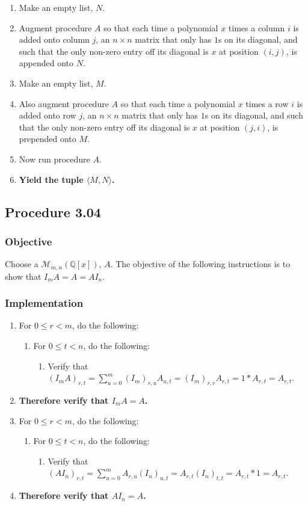 \documentclass[twocolumn]{article}
\newcommand{\procedure}[2][]{\subsection*{Procedure #2 \ifthenelse{\equal{#1}{}}{}{(#1)}}\label{sec:procedure #2}}
\newcommand{\objective}{\subsubsection*{Objective}}
\newcommand{\implementation}{\subsubsection*{Implementation}}
\begin{document}
				\begin{enumerate}
					\item Make an empty list, $N$.
					\item Augment procedure $A$ so that each time a polynomial $x$ times a column $i$ is added onto column $j$, an $n\times n$ matrix that only has $1$s on its diagonal, and such that the only non-zero entry off its diagonal is $x$ at position $(i,j)$, is appended onto $N$.
					\item Make an empty list, $M$.
					\item Also augment procedure $A$ so that each time a polynomial $x$ times a row $i$ is added onto row $j$, an $n\times n$ matrix that only has $1$s on its diagonal, and such that the only non-zero entry off its diagonal is $x$ at position $(j,i)$, is prepended onto $M$.
					\item Now run procedure $A$.
					\item \textbf{Yield the tuple $\langle M,N\rangle$.}
				\end{enumerate}
		\procedure{3.04}
			\objective
				Choose a $\mathcal{M}_{m,n}(\mathbb{Q}[x])$, $A$. The objective of the following instructions is to show that $I_mA=A=AI_n$.
			\implementation
				\begin{enumerate}
					\item For $0\le r<m$, do the following:
					\begin{enumerate}
						\item For $0\le t<n$, do the following:
						\begin{enumerate}
							\item Verify that $(I_mA)_{r,t}=\sum_{u=0}^m (I_m)_{r,u}A_{u,t}=(I_m)_{r,r}A_{r,t}=1*A_{r,t}=A_{r,t}$.
						\end{enumerate}
					\end{enumerate}
					\item \textbf{Therefore verify that $I_mA=A$.}
					\item For $0\le r<m$, do the following:
					\begin{enumerate}
						\item For $0\le t<n$, do the following:
						\begin{enumerate}
							\item Verify that $(AI_n)_{r,t}=\sum_{u=0}^m A_{r,u}(I_n)_{u,t}=A_{r,t}(I_n)_{t,t}=A_{r,t}*1=A_{r,t}$.
						\end{enumerate}
					\end{enumerate}
					\item \textbf{Therefore verify that $AI_n=A$.}
				\end{enumerate}
\end{document}
